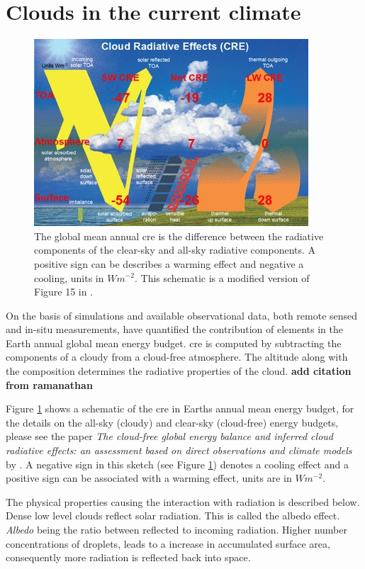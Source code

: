 \section{Clouds in the current climate} \label{sec:intro_cloud_current_climate}
\begin{figure}[h]
    \centering
    \includegraphics[scale = 7]{Chapter1_Intro/images/CRE_wild2019.jpg}
    \caption{The global mean annual \acrfull{cre} is the difference between the radiative components of the clear-sky and all-sky radiative components. A positive sign can be describes a warming effect and negative a cooling, units in $W m^{-2}$. This schematic is a modified version of Figure 15 in \cite{Wild2019TheModels}.
    }
    \label{fig:cre}
\end{figure}
On the basis of simulations and available observational data, both remote sensed and in-situ measurements,  \citeauthor{Wild2019TheModels} have quantified the contribution of elements in the Earth annual global mean energy budget. \acrfull{cre} is computed by subtracting the components of a cloudy from a cloud-free atmosphere. The altitude along with the composition determines the radiative properties of the cloud. \textbf{add citation from ramanathan }

Figure \ref{fig:cre} shows a schematic of the \acrshort{cre} in Earths annual mean energy budget, for the details on the all-sky (cloudy) and clear-sky (cloud-free) energy budgets, please see the paper \textit{The cloud-free global energy balance and inferred cloud radiative effects: an assessment based on direct observations and climate models} by \cite{Wild2019TheModels}. A negative sign in this sketch (see Figure \ref{fig:cre}) denotes a cooling effect and a positive sign can be associated with a warming effect, units are in $W m^{-2}$. 

The physical properties causing the interaction with radiation is described below. Dense low level clouds reflect solar radiation. This is called the albedo effect. \textit{Albedo} being the ratio between reflected to incoming radiation. Higher number concentrations of droplets, leads to a increase in accumulated surface area, consequently more radiation is reflected back into space. 

